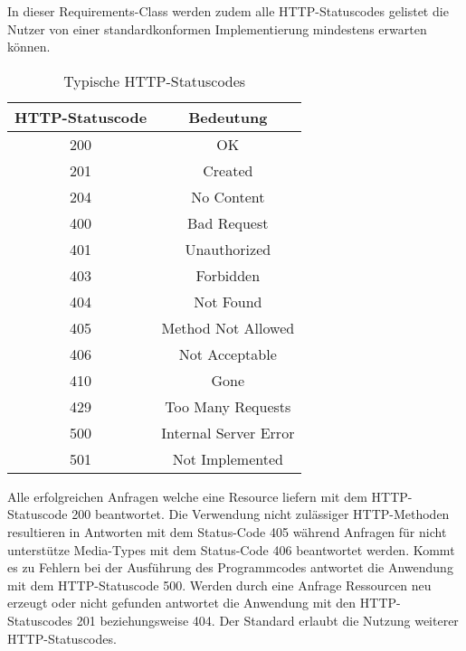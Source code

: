 In dieser Requirements-Class werden zudem alle HTTP-Statuscodes gelistet die Nutzer von einer standardkonformen Implementierung mindestens erwarten können. 
\begin{table}[H]
    \caption{Typische HTTP-Statuscodes \cite{ogc_api_processes_core}}
    \centering
    \begin{tabular}{c c} 
        HTTP-Statuscode & Bedeutung\\ 
        \hline
        200 & OK\\
        201 & Created\\
        204 & No Content\\
        400 & Bad Request\\
        401 & Unauthorized\\
        403 & Forbidden\\
        404 & Not Found\\
        405 & Method Not Allowed\\
        406 & Not Acceptable\\
        410 & Gone\\
        429 & Too Many Requests\\
        500 & Internal Server Error\\
        501 & Not Implemented\\
    \end{tabular}\label{httpcodes}
\end{table}
Alle erfolgreichen Anfragen welche eine Resource liefern mit dem HTTP-Statuscode 200 beantwortet. Die Verwendung nicht zulässiger HTTP-Methoden resultieren 
in Antworten mit dem Status-Code 405 während Anfragen für nicht unterstütze Media-Types mit dem Status-Code 406 beantwortet werden. Kommt es zu Fehlern bei der Ausführung 
des Programmcodes antwortet die Anwendung mit dem HTTP-Statuscode 500. Werden durch eine Anfrage Ressourcen neu erzeugt oder nicht gefunden antwortet die Anwendung mit 
den HTTP-Statuscodes 201 beziehungsweise 404. Der Standard erlaubt die Nutzung weiterer HTTP-Statuscodes.

